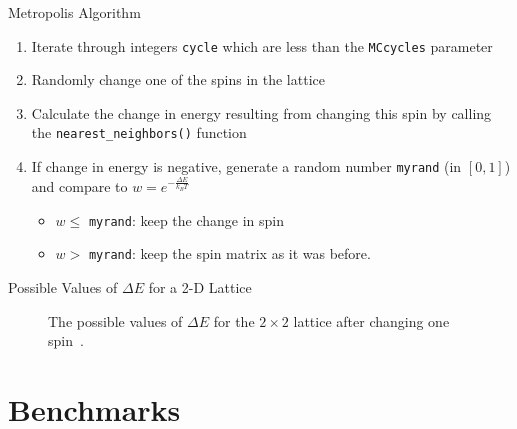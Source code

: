 \documentclass{beamer} %
\begin{document}
\begin{frame}{Metropolis Algorithm}
\begin{enumerate}
\item Iterate through integers \texttt{cycle} which are less than the \texttt{MCcycles} parameter
\item Randomly change one of the spins in the lattice 
\item Calculate the change in energy resulting from changing this spin by calling the \texttt{nearest\_neighbors()} function  
\item If change in energy is negative, generate a random number \texttt{myrand} (in $\left[0,1\right]$) and compare to $w=e^{-\frac{\Delta E}{k_{B}T}}$
\begin{itemize}
\item $w \leq$ \texttt{myrand}: keep the change in spin
\item $w >$ \texttt{myrand}: keep the spin matrix as it was before.
\end{itemize}
\end{enumerate}
\end{frame}

\begin{frame}{Possible Values of $\Delta E$ for a 2-D Lattice}
\begin{figure}[ht]
\begin{center}
\caption{The possible values of $\Delta E$ for the $2\times2$ lattice after changing one spin~\cite{lecture}.}
\label{fig:deltaEs}
\end{center}
\end{figure}
\end{frame}

\section{Benchmarks}
\end{document}
